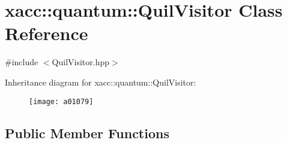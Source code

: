 \hypertarget{a01079}{}\section{xacc\+:\+:quantum\+:\+:Quil\+Visitor Class Reference}
\label{a01079}


{\ttfamily \#include $<$Quil\+Visitor.\+hpp$>$}

Inheritance diagram for xacc\+:\+:quantum\+:\+:Quil\+Visitor\+:\begin{figure}[H]
\begin{center}
\leavevmode
\texttt{[image: a01079]}
\end{center}
\end{figure}
\subsection*{Public Member Functions}
